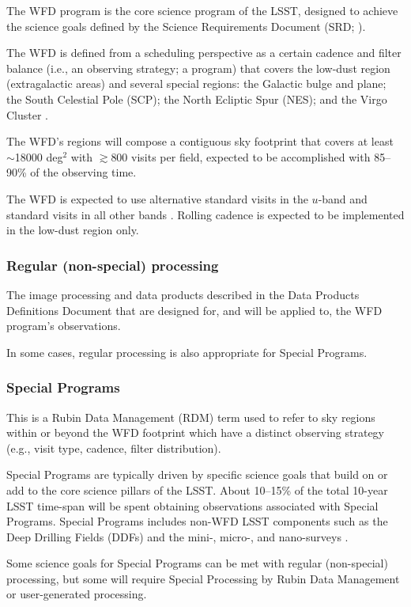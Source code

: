 The WFD program is the core science program of the LSST, designed to achieve the science 
goals defined by the Science Requirements Document (SRD; ).

The WFD is defined from a scheduling perspective as a certain cadence and filter balance 
(i.e., an observing strategy; a program) 
that covers the low-dust region (extragalactic areas) and several special regions:
the Galactic bulge and plane; the South Celestial Pole (SCP); the North Ecliptic Spur (NES);
and the Virgo Cluster .

The WFD's regions will compose a contiguous sky footprint that covers at least $\sim$18000 deg$^2$ with 
$\gtrsim$800 visits per field, expected to be accomplished with 85--90\% 
of the observing time.

The WFD is expected to use alternative standard visits in the $u$-band and 
standard visits in all other bands .
Rolling cadence is expected to be implemented in the low-dust region only.

\subsubsection{Regular (non-special) processing}

The image processing and data products described in the Data Products Definitions Document
 that are designed for, and will be applied to, the WFD program's observations.

In some cases, regular processing is also appropriate for Special Programs.

\subsubsection{Special Programs} 

This is a Rubin Data Management (RDM) term used to refer to sky regions within
or beyond the WFD footprint which have a distinct observing strategy
(e.g., visit type, cadence, filter distribution).

Special Programs are typically driven by specific science goals that build on or 
add to the core science pillars of the LSST.
About 10--15\% of the total 10-year LSST time-span will be spent obtaining 
observations associated with Special Programs.
Special Programs includes non-WFD LSST components such as the Deep Drilling 
Fields (DDFs) and the mini-, micro-, and nano-surveys .

Some science goals for Special Programs can be met with regular (non-special) processing,
but some will require Special Processing by Rubin Data Management or user-generated processing.

